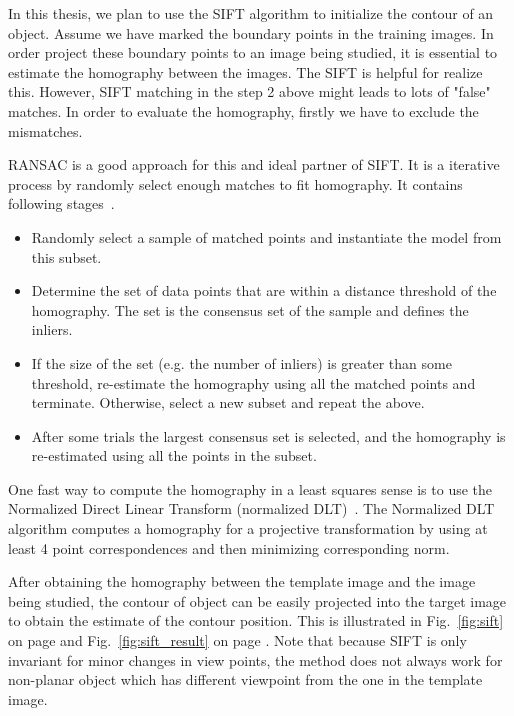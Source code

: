 In this thesis, we plan to use the SIFT algorithm to initialize the
contour of an object. Assume we have marked the boundary points in the
training images. In order project these boundary points to an image
being studied, it is essential to estimate the homography between the
images. The SIFT is helpful for realize this. However, SIFT matching
in the step 2 above might leads to lots of "false" matches. In order
to evaluate the homography, firstly we have to exclude the
mismatches. 

RANSAC is a good approach for this and ideal partner of SIFT. It is a
iterative process by randomly select enough matches to fit
homography. It contains following stages~\cite{fischler1981random}.
\begin{itemize}
\item  Randomly select a sample of matched points and instantiate the
  model from this subset.
\item Determine the set of data points that are within a distance
  threshold of the homography. The set is the consensus set of the sample
  and defines the inliers.
\item If the size of the set (e.g. the number of inliers) is greater
  than some threshold, re-estimate the homography using all the matched
  points and terminate. Otherwise, select a new subset and repeat the
  above.
\item After some trials the largest consensus set is selected, and the
  homography is re-estimated using all the points in the subset.
\end{itemize}
One fast way to compute the homography in a least squares sense is to use the Normalized
Direct Linear Transform (normalized
DLT)~\cite{hartley2003multiple}. The Normalized DLT algorithm computes
a homography for a projective transformation by using at least 4 point
correspondences and then minimizing corresponding norm.

After obtaining the homography between the template image and the
image being studied, the contour of object can be easily projected
into the target image to obtain the estimate of the contour
position. This is illustrated in Fig.~\ref{fig:sift} on page
\pageref{fig:sift} and Fig.~\ref{fig:sift_result} on page
\pageref{fig:sift_result}. Note that because SIFT is only invariant for
minor changes in view points, the method does not always work for
non-planar object which has different viewpoint from the one in the
template image.

